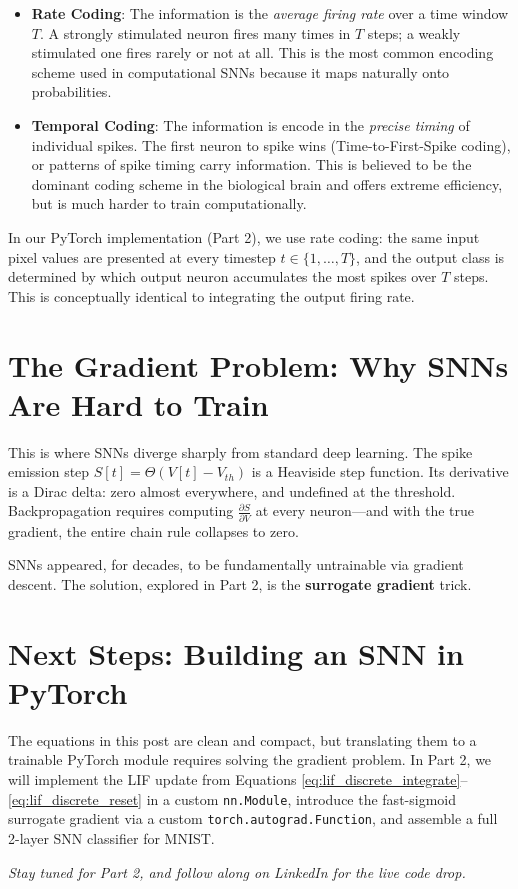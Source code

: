 \documentclass[12pt]{article}
\begin{document}
\begin{itemize}
    \item \textbf{Rate Coding}: The information is the \textit{average firing rate} over a time window $T$. A strongly stimulated neuron fires many times in $T$ steps; a weakly stimulated one fires rarely or not at all. This is the most common encoding scheme used in computational SNNs because it maps naturally onto probabilities.
    \item \textbf{Temporal Coding}: The information is encode in the \textit{precise timing} of individual spikes. The first neuron to spike wins (Time-to-First-Spike coding), or patterns of spike timing carry information. This is believed to be the dominant coding scheme in the biological brain and offers extreme efficiency, but is much harder to train computationally.
\end{itemize}

In our PyTorch implementation (Part 2), we use rate coding: the same input pixel values are presented at every timestep $t \in \{1, \ldots, T\}$, and the output class is determined by which output neuron accumulates the most spikes over $T$ steps. This is conceptually identical to integrating the output firing rate.

\section*{The Gradient Problem: Why SNNs Are Hard to Train}
This is where SNNs diverge sharply from standard deep learning. The spike emission step $S[t] = \Theta(V[t] - V_{th})$ is a Heaviside step function. Its derivative is a Dirac delta: zero almost everywhere, and undefined at the threshold. Backpropagation requires computing $\frac{\partial S}{\partial V}$ at every neuron—and with the true gradient, the entire chain rule collapses to zero.

SNNs appeared, for decades, to be fundamentally untrainable via gradient descent. The solution, explored in Part 2, is the \textbf{surrogate gradient} trick.

\section*{Next Steps: Building an SNN in PyTorch}
The equations in this post are clean and compact, but translating them to a trainable PyTorch module requires solving the gradient problem. In Part 2, we will implement the LIF update from Equations \ref{eq:lif_discrete_integrate}--\ref{eq:lif_discrete_reset} in a custom \texttt{nn.Module}, introduce the fast-sigmoid surrogate gradient via a custom \texttt{torch.autograd.Function}, and assemble a full 2-layer SNN classifier for MNIST.

\vspace{1em}
\noindent \textit{Stay tuned for Part 2, and follow along on LinkedIn for the live code drop.}
\end{document}
